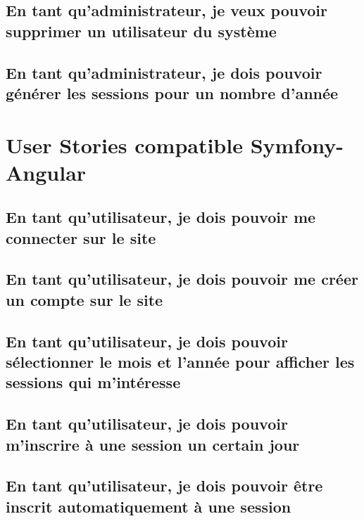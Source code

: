 	\vspace{\baselineskip}
	\vspace{\baselineskip}
	\subsection{En tant qu'administrateur, je veux pouvoir supprimer un utilisateur du système}
		
	
	\newpage
	\subsection{En tant qu'administrateur, je dois pouvoir générer les sessions pour un nombre d'année}
		

\newpage
\section{User Stories compatible Symfony-Angular}
	
	\subsection{En tant qu’utilisateur, je dois pouvoir me connecter sur le site}
		
	
	\newpage
	\subsection{En tant qu’utilisateur, je dois pouvoir me créer un compte sur le site}
		

	\vspace{\baselineskip}
	\subsection{En tant qu'utilisateur, je dois pouvoir sélectionner le mois et l'année pour afficher les sessions qui m'intéresse}
		
	
	\vspace{\baselineskip}
	\subsection{En tant qu’utilisateur, je dois pouvoir m’inscrire à une session un certain jour}
		

	\vspace{\baselineskip}
	\subsection{En tant qu’utilisateur, je dois pouvoir être inscrit automatiquement à une session}
		
	
